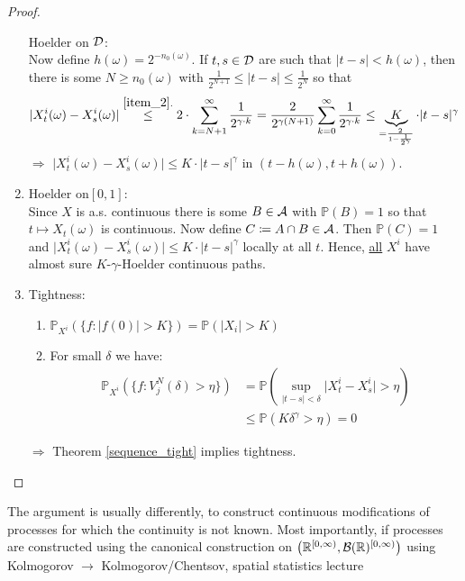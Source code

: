 \begin{proof}
\begin{enumerate}
			Hoelder on $\mathcal{D}$:\\
			Now define $h(\omega) = 2^{-n_0(\omega)}$. If $t,s\in\mathcal{D}$ are such that $\lvert t-s \rvert < h(\omega)$, then there is some $N \geq n_0(\omega)$ with $\frac{1}{2^{N+1}} \leq \lvert t - s \rvert \leq \frac{1}{2^N}$ so that 
			\begin{align*}
				\lvert X_t^i(\omega) - X_s^i(\omega) \rvert \overset{\ref{item_2}.}{\leq} 2 \cdot \sum_{k=N+1}^{\infty} \frac{1}{2^{\gamma \cdot k}} = \frac{2}{2^{\gamma(N+1)}} \sum_{k=0}^{\infty} \frac{1}{2^{\gamma \cdot k}} \leq \underbrace{K}_{=\frac{2}{1-\frac{1}{2^{\gamma}}}} \cdot \lvert t-s \rvert^{\gamma}
			\end{align*}
			$\Rightarrow$ $\lvert X_t^i(\omega) - X_s^i(\omega) \rvert \leq K \cdot \lvert t - s \rvert^{\gamma}$ in $\left(t-h(\omega),t+h(\omega)\right)$.
		\item
			Hoelder on$[0,1]$:\\
			Since $X$ is a.s. continuous there is some $B\in \mathcal{A}$ with $\mathbb{P}(B) = 1$ so that $t \mapsto X_t(\omega)$ is continuous. Now define $C \coloneqq A \cap B \in \mathcal{A}$. Then $\mathbb{P}(C)=1$ and $\lvert X_t^i(\omega) - X_s^i(\omega) \rvert \leq K \cdot \lvert t - s \rvert^{\gamma}$ locally at all $t$. Hence, \underline{all} $X^i$ have almost sure $K$-$\gamma$-Hoelder continuous paths.
		\item Tightness:
			\begin{enumerate}[label=(\roman*)]
				\item $\mathbb{P}_{X^i}\left( \{ f \colon \lvert f(0) \rvert > K\}\right) = \mathbb{P}(\lvert X_i \rvert > K)$ \checkmark
				\item For small $\delta$ we have:
					\begin{align*}
						\mathbb{P}_{X^i} \left( \{ f \colon V_j^N(\delta)>\eta\}\right) &= \mathbb{P}\left( \sup_{\lvert t-s \rvert < \delta} \lvert X_t^i - X_s^i \rvert > \eta \right) \\
							&\leq \mathbb{P}\left( K \delta^{\gamma} > \eta \right) = 0
					\end{align*}
			\end{enumerate}
			$\Rightarrow$ Theorem \ref{sequence_tight} implies tightness.
	\end{enumerate}
\end{proof}
\begin{bem1}
	The argument is usually differently, to construct continuous modifications of processes for which the continuity is not known. Most importantly, if processes are constructed using the canonical construction on $\left(\mathbb{R}^{[0,\infty)},\mathcal{B}(\mathbb{R})^{[0,\infty)}\right)$ using Kolmogorov $\rightarrow$ Kolmogorov/Chentsov, spatial statistics lecture
\end{bem1}
